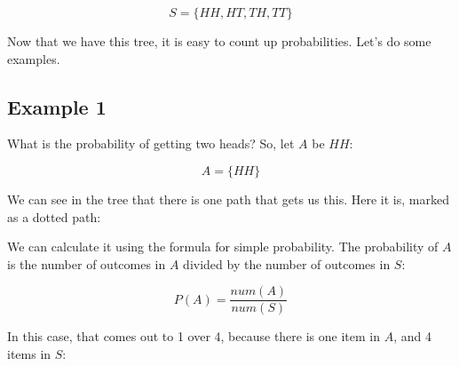 \documentclass[../../../main.tex]{subfiles}
\begin{document}
\begin{equation*}
  S = \{ HH, HT, TH, TT \}
\end{equation*}

\noindent
Now that we have this tree, it is easy to count up probabilities. Let's do some examples.
 

\subsection{Example 1}

What is the probability of getting two heads? So, let $A$ be $HH$:

\begin{equation*}
  A = \{ HH \}
\end{equation*}

\noindent
We can see in the tree that there is one path that gets us this. Here it is, marked as a dotted path:

\begin{center}
\end{center}

\noindent
We can calculate it using the formula for simple probability. The probability of $A$ is the number of outcomes in $A$ divided by the number of outcomes in $S$:

\begin{equation*}
  P(A) = \frac{num(A)}{num(S)}
\end{equation*}

\noindent
In this case, that comes out to 1 over 4, because there is one item in $A$, and 4 items in $S$:
\end{document}
